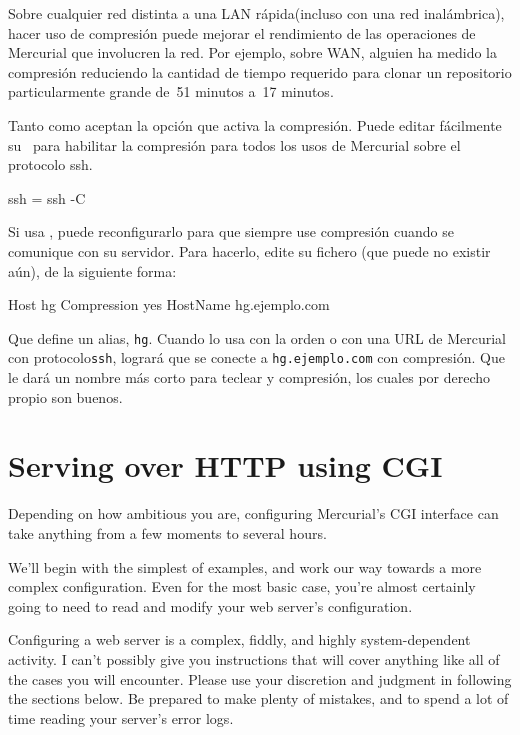 Sobre cualquier red distinta a una LAN rápida(incluso con una red
inalámbrica), hacer uso de compresión puede mejorar el rendimiento
de las operaciones de Mercurial que involucren la red.  Por ejemplo,
sobre WAN, alguien ha medido la compresión reduciendo la cantidad
de tiempo requerido para clonar un repositorio particularmente
grande de~51 minutos a~17 minutos.

Tanto  como  aceptan la opción
 que activa la compresión.  Puede editar fácilmente
su \hgrc\ para habilitar la compresión para todos los usos de
Mercurial sobre el protocolo ssh.
\begin{codesample2}
  [ui]
  ssh = ssh -C
\end{codesample2}

Si usa , puede reconfigurarlo para que siempre use
compresión cuando se comunique con su servidor.  Para hacerlo,
edite su fichero (que puede no existir
aún), de la siguiente forma:
\begin{codesample2}
  Host hg
    Compression yes
    HostName hg.ejemplo.com
\end{codesample2}
Que define un alias, \texttt{hg}.  Cuando lo usa con la orden
 o con una URL de Mercurial con protocolo\texttt{ssh},
logrará que  se conecte a \texttt{hg.ejemplo.com}
con compresión.  Que le dará un nombre más corto para teclear y
compresión, los cuales por derecho propio son buenos.

\section{Serving over HTTP using CGI}
\label{sec:collab:cgi}

Depending on how ambitious you are, configuring Mercurial's CGI
interface can take anything from a few moments to several hours.

We'll begin with the simplest of examples, and work our way towards a
more complex configuration.  Even for the most basic case, you're
almost certainly going to need to read and modify your web server's
configuration.

\begin{note}
  Configuring a web server is a complex, fiddly, and highly
  system-dependent activity.  I can't possibly give you instructions
  that will cover anything like all of the cases you will encounter.
  Please use your discretion and judgment in following the sections
  below.  Be prepared to make plenty of mistakes, and to spend a lot
  of time reading your server's error logs.
\end{note}

